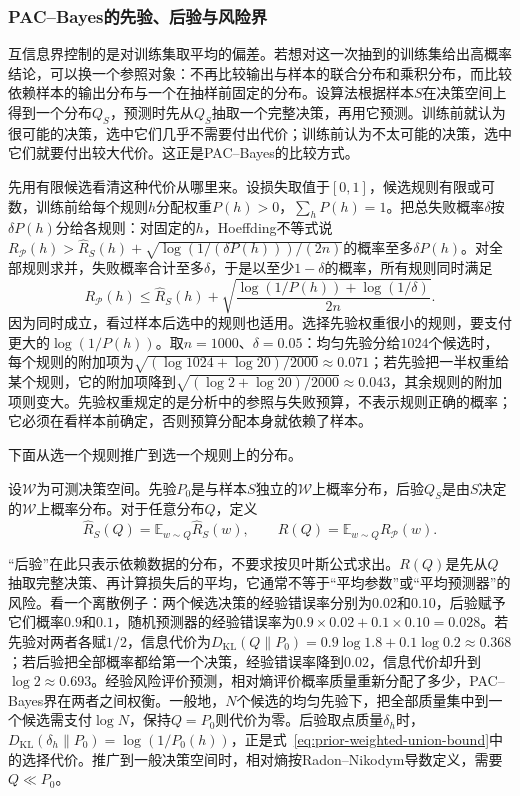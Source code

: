 \subsubsection{PAC--Bayes的先验、后验与风险界}
\label{sec:pac-bayes}

互信息界控制的是对训练集取平均的偏差。若想对这一次抽到的训练集给出高概率结论，可以换一个参照对象：不再比较输出与样本的联合分布和乘积分布，而比较依赖样本的输出分布与一个在抽样前固定的分布。设算法根据样本$S$在决策空间上得到一个分布$Q_S$，预测时先从$Q_S$抽取一个完整决策，再用它预测。训练前就认为很可能的决策，选中它们几乎不需要付出代价；训练前认为不太可能的决策，选中它们就要付出较大代价。这正是PAC--Bayes的比较方式。

先用有限候选看清这种代价从哪里来。设损失取值于$[0,1]$，候选规则有限或可数，训练前给每个规则$h$分配权重$P(h)>0$，$\sum_hP(h)=1$。把总失败概率$\delta$按$\delta P(h)$分给各规则：对固定的$h$，Hoeffding不等式说$R_{\mathcal P}(h)>\hat R_S(h)+\sqrt{\log(1/(\delta P(h)))/(2n)}$的概率至多$\delta P(h)$。对全部规则求并，失败概率合计至多$\delta$，于是以至少$1-\delta$的概率，所有规则同时满足
\begin{equation}
 R_{\mathcal P}(h)\leq\hat R_S(h)+\sqrt{\frac{\log(1/P(h))+\log(1/\delta)}{2n}}.
 \label{eq:prior-weighted-union-bound}
\end{equation}
因为同时成立，看过样本后选中的规则也适用。选择先验权重很小的规则，要支付更大的$\log(1/P(h))$。取$n=1000$、$\delta=0.05$：均匀先验分给$1024$个候选时，每个规则的附加项为$\sqrt{(\log1024+\log20)/2000}\approx0.071$；若先验把一半权重给某个规则，它的附加项降到$\sqrt{(\log2+\log20)/2000}\approx0.043$，其余规则的附加项则变大。先验权重规定的是分析中的参照与失败预算，不表示规则正确的概率；它必须在看样本前确定，否则预算分配本身就依赖了样本。

下面从选一个规则推广到选一个规则上的分布。

\begin{definition}
\label{def:pac-bayes-distributions}
设$\mathcal W$为可测决策空间。先验$P_0$是与样本$S$独立的$\mathcal W$上概率分布，后验$Q_S$是由$S$决定的$\mathcal W$上概率分布。对于任意分布$Q$，定义
\[
 \hat R_S(Q)=\mathbb E_{w\sim Q}\hat R_S(w),\qquad R(Q)=\mathbb E_{w\sim Q}R_{\mathcal P}(w).
\]
\end{definition}

“后验”在此只表示依赖数据的分布，不要求按贝叶斯公式求出。$R(Q)$是先从$Q$抽取完整决策、再计算损失后的平均，它通常不等于“平均参数”或“平均预测器”的风险。看一个离散例子：两个候选决策的经验错误率分别为$0.02$和$0.10$，后验赋予它们概率$0.9$和$0.1$，随机预测器的经验错误率为$0.9\times0.02+0.1\times0.10=0.028$。若先验对两者各赋$1/2$，信息代价为$D_{\mathrm{KL}}(Q\|P_0)=0.9\log1.8+0.1\log0.2\approx0.368$；若后验把全部概率都给第一个决策，经验错误率降到$0.02$，信息代价却升到$\log2\approx0.693$。经验风险评价预测，相对熵评价概率质量重新分配了多少，PAC--Bayes界在两者之间权衡。一般地，$N$个候选的均匀先验下，把全部质量集中到一个候选需支付$\log N$，保持$Q=P_0$则代价为零。后验取点质量$\delta_h$时，$D_{\mathrm{KL}}(\delta_h\|P_0)=\log(1/P_0(h))$，正是式~\eqref{eq:prior-weighted-union-bound}中的选择代价。推广到一般决策空间时，相对熵按Radon--Nikodym导数定义，需要$Q\ll P_0$。

